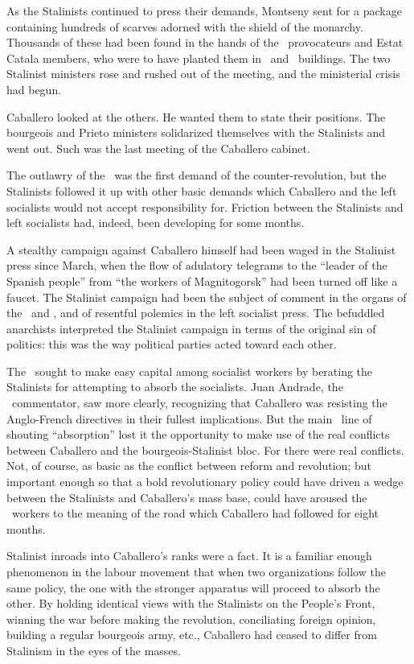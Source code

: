 As the Stalinists continued to press their demands, Montseny sent for a package containing hundreds of scarves adorned with the shield of the monarchy. Thousands of these had been found in the hands of the \PSUC\ provocateurs and Estat Catala members, who were to have planted them in \POUM\ and \CNT\ buildings. The two Stalinist ministers rose and rushed out of the meeting, and the ministerial crisis had begun.

Caballero looked at the others. He wanted them to state their positions. The bourgeois and Prieto ministers solidarized themselves with the Stalinists and went out. Such was the last meeting of the Caballero cabinet.

\dinkus

The outlawry of the \POUM\ was the first demand of the counter-revolution, but the Stalinists followed it up with other basic demands which Caballero and the left socialists would not accept responsibility for.
Friction between the Stalinists and left socialists had, indeed, been developing for some months.

A stealthy campaign against Caballero himself had been waged in the Stalinist press since March, when the flow of adulatory telegrams to the ``leader of the Spanish people'' from ``the workers of Magnitogorsk'' had been turned off like a faucet. The Stalinist campaign had been the subject of comment in the organs of the \CNT\ and \POUM, and of resentful polemics in the left socialist press. The befuddled anarchists interpreted the Stalinist campaign in terms of the original sin of politics: this was the way political parties acted toward each other.

The \POUM\ sought to make easy capital among socialist workers by berating the Stalinists for attempting to absorb the socialists. Juan Andrade, the \POUM\ commentator, saw more clearly, recognizing that Caballero was resisting the Anglo-French directives in their fullest implications. But the main \POUM\ line of shouting ``absorption'' lost it the opportunity to make use of the real conflicts between Caballero and the bourgeois-Stalinist bloc. For there were real conflicts. Not, of course, as basic as the conflict between reform and revolution; but important enough so that a bold revolutionary policy could have driven a wedge between the Stalinists and Caballero’s mass base, could have aroused the \UGT\ workers to the meaning of the road which Caballero had followed for eight months.

Stalinist inroads into Caballero’s ranks were a fact. It is a familiar enough phenomenon in the labour movement that when two organizations follow the same policy, the one with the stronger apparatus will proceed to absorb the other. By holding identical views with the Stalinists on the People’s Front, winning the war before making the revolution, conciliating foreign opinion, building a regular bourgeois army, etc., Caballero had ceased to differ from Stalinism in the eyes of the masses.

